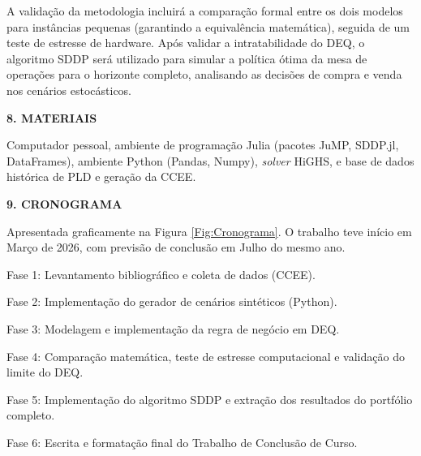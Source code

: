 \documentclass[a4paper,12pt,oneside,openany]{report}
\begin{document}
A validação da metodologia incluirá a comparação formal entre os dois modelos para instâncias pequenas (garantindo a equivalência matemática), seguida de um teste de estresse de hardware. Após validar a intratabilidade do DEQ, o algoritmo SDDP será utilizado para simular a política ótima da mesa de operações para o horizonte completo, analisando as decisões de compra e venda nos cenários estocásticos.

\vspace{0.4cm}
\textbf{8. MATERIAIS}
      
Computador pessoal, ambiente de programação Julia (pacotes JuMP, SDDP.jl, DataFrames), ambiente Python (Pandas, Numpy), \textit{solver} HiGHS, e base de dados histórica de PLD e geração da CCEE.

\vspace{0.4cm}
\textbf{9. CRONOGRAMA}

Apresentada graficamente na Figura \ref{Fig:Cronograma}. O trabalho teve início em Março de 2026, com previsão de conclusão em Julho do mesmo ano.

Fase 1: Levantamento bibliográfico e coleta de dados (CCEE).

Fase 2: Implementação do gerador de cenários sintéticos (Python).

Fase 3: Modelagem e implementação da regra de negócio em DEQ.

Fase 4: Comparação matemática, teste de estresse computacional e validação do limite do DEQ.

Fase 5: Implementação do algoritmo SDDP e extração dos resultados do portfólio completo.

Fase 6: Escrita e formatação final do Trabalho de Conclusão de Curso.
\end{document}
